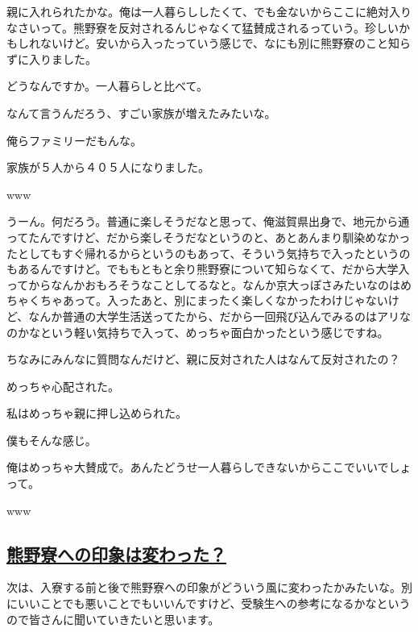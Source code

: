 \begin{multicols}{2}
  
親に入れられたかな。俺は一人暮らししたくて、でも金ないからここに絶対入りなさいって。熊野寮を反対されるんじゃなくて猛賛成されるっていう。珍しいかもしれないけど。安いから入ったっていう感じで、なにも別に熊野寮のこと知らずに入りました。

  
どうなんですか。一人暮らしと比べて。

  
なんて言うんだろう、すごい家族が増えたみたいな。

  
俺らファミリーだもんな。

  
家族が５人から４０５人になりました。

  
www

  
うーん。何だろう。普通に楽しそうだなと思って、俺滋賀県出身で、地元から通ってたんですけど、だから楽しそうだなというのと、あとあんまり馴染めなかったとしてもすぐ帰れるからというのもあって、そういう気持ちで入ったというのもあるんですけど。でももともと余り熊野寮について知らなくて、だから大学入ってからなんかおもろそうなことしてるなと。なんか京大っぽさみたいなのはめちゃくちゃあって。入ったあと、別にまったく楽しくなかったわけじゃないけど、なんか普通の大学生活送ってたから、だから一回飛び込んでみるのはアリなのかなという軽い気持ちで入って、めっちゃ面白かったという感じですね。

  
ちなみにみんなに質問なんだけど、親に反対された人はなんて反対されたの？

  
めっちゃ心配された。

  
私はめっちゃ親に押し込められた。

  
僕もそんな感じ。

  
俺はめっちゃ大賛成で。あんたどうせ一人暮らしできないからここでいいでしょって。

  
www


\vspace{15mm}
\subsection{\LARGE\underline{\bf{熊野寮への印象は変わった？}}}
\vspace{3mm}

次は、入寮する前と後で熊野寮への印象がどういう風に変わったかみたいな。別にいいことでも悪いことでもいいんですけど、受験生への参考になるかなというので皆さんに聞いていきたいと思います。


\end{multicols}
